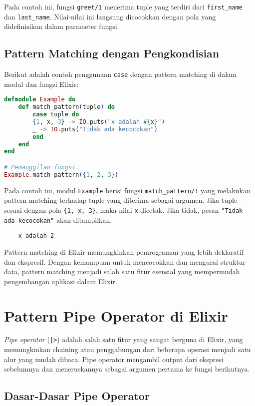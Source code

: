Pada contoh ini, fungsi \texttt{greet/1} menerima tuple yang terdiri dari \texttt{first\_name} dan \texttt{last\_name}. Nilai-nilai ini langsung dicocokkan dengan pola yang didefinisikan dalam parameter fungsi.

\subsection{Pattern Matching dengan Pengkondisian}

Berikut adalah contoh penggunaan \texttt{case} dengan pattern matching di dalam modul dan fungsi Elixir:

\begin{lstlisting}[language=Elixir]
defmodule Example do
	def match_pattern(tuple) do
		case tuple do
		{1, x, 3} -> IO.puts("x adalah #{x}")
		_ -> IO.puts("Tidak ada kecocokan")
		end
	end
end

# Pemanggilan fungsi
Example.match_pattern({1, 2, 3})
\end{lstlisting}

Pada contoh ini, modul \texttt{Example} berisi fungsi \texttt{match\_pattern/1} yang melakukan pattern matching terhadap tuple yang diterima sebagai argumen. Jika tuple sesuai dengan pola \texttt{\{1, x, 3\}}, maka nilai \texttt{x} dicetak. Jika tidak, pesan \texttt{"Tidak ada kecocokan"} akan ditampilkan.

\begin{verbatim}
	x adalah 2
\end{verbatim}


Pattern matching di Elixir memungkinkan pemrograman yang lebih deklaratif dan ekspresif. Dengan kemampuan untuk mencocokkan dan mengurai struktur data, pattern matching menjadi salah satu fitur esensial yang mempermudah pengembangan aplikasi dalam Elixir.



\section{Pattern Pipe Operator di Elixir}

\textit{Pipe operator} (\texttt{|>}) adalah salah satu fitur yang sangat berguna di Elixir, yang memungkinkan chaining atau penggabungan dari beberapa operasi menjadi satu alur yang mudah dibaca. Pipe operator mengambil output dari ekspresi sebelumnya dan meneruskannya sebagai argumen pertama ke fungsi berikutnya.

\subsection{Dasar-Dasar Pipe Operator}

